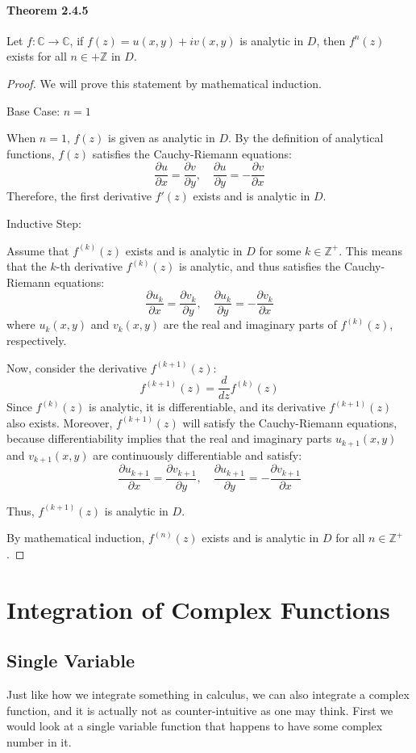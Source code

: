 \documentclass[12pt]{book}
\newcommand{\Z}{\mathbb{Z}}
\newcommand{\C}{\mathbb{C}}
\newcommand{\pypx}[2]{\frac{\partial #1}{\partial #2}}
\begin{document}
\subsubsection{Theorem 2.4.5}
Let $f \colon \C \to \C$, if $f(z) = u(x,y)+iv(x,y)$ is analytic in $D$, then $f^n(z)$ exists for all $n \in +\Z$ in $D$. 
\begin{proof}
We will prove this statement by mathematical induction.

Base Case: \( n = 1 \)

When \( n = 1 \), \( f(z) \) is given as analytic in \( D \). By the definition of analytical functions, \( f(z) \) satisfies the Cauchy-Riemann equations:
\[
\pypx{u}{x} = \pypx{v}{y}, \quad \pypx{u}{y} = -\pypx{v}{x}
\]
Therefore, the first derivative \( f'(z) \) exists and is analytic in \( D \).

Inductive Step:

Assume that \( f^{(k)}(z) \) exists and is analytic in \( D \) for some \( k \in \mathbb{Z}^+ \). This means that the \( k \)-th derivative \( f^{(k)}(z) \) is analytic, and thus satisfies the Cauchy-Riemann equations:
\[
\pypx{u_k}{x} = \pypx{v_k}{y}, \quad \pypx{u_k}{y} = -\pypx{v_k}{x}
\]
where \( u_k(x,y) \) and \( v_k(x,y) \) are the real and imaginary parts of \( f^{(k)}(z) \), respectively.

Now, consider the derivative \( f^{(k+1)}(z) \):
\[
f^{(k+1)}(z) = \frac{d}{dz} f^{(k)}(z)
\]
Since \( f^{(k)}(z) \) is analytic, it is differentiable, and its derivative \( f^{(k+1)}(z) \) also exists. Moreover, \( f^{(k+1)}(z) \) will satisfy the Cauchy-Riemann equations, because differentiability implies that the real and imaginary parts \( u_{k+1}(x,y) \) and \( v_{k+1}(x,y) \) are continuously differentiable and satisfy:
\[
\pypx{u_{k+1}}{x} = \pypx{v_{k+1}}{y}, \quad \pypx{u_{k+1}}{y} = -\pypx{v_{k+1}}{x}
\]

Thus, \( f^{(k+1)}(z) \) is analytic in \( D \).

By mathematical induction, \( f^{(n)}(z) \) exists and is analytic in \( D \) for all \( n \in \mathbb{Z}^+ \). 
\end{proof}



\chapter{Integration of Complex Functions}
\section{Single Variable}
Just like how we integrate something in calculus, we can also integrate a complex function, and it is actually not as counter-intuitive as one may think. First we would look at a single variable function that happens to have some complex number in it. 
\end{document}
